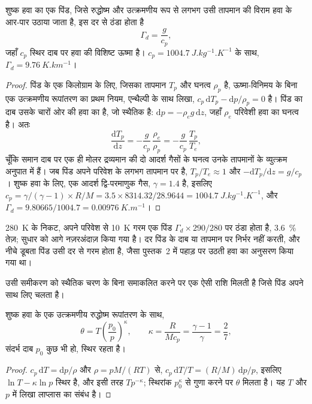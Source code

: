 \begin{theorem}[शुष्क रुद्धोष्म तापह्रास दर]\label{thm:b1:fluid-envelopes-structure:dry-adiabatic}
शुष्क हवा का एक पिंड, जिसे रुद्धोष्म और उत्क्रमणीय रूप से लगभग उसी तापमान की विराम हवा के आर-पार उठाया जाता है, इस दर से ठंडा होता है
\[
  \Gamma_d = \frac{g}{c_p},
\]
जहाँ $c_p$ स्थिर दाब पर हवा की विशिष्ट ऊष्मा है। $c_p =
\qty{1004.7}{J.kg^{-1}.K^{-1}}$ के साथ, $\Gamma_d = \qty{9.76}{K.km^{-1}}$।
\end{theorem}

\begin{proof}
पिंड के एक किलोग्राम के लिए, जिसका तापमान $T_p$ और घनत्व $\rho_p$ है, ऊष्मा-विनिमय के बिना एक उत्क्रमणीय रूपांतरण का प्रथम नियम, एन्थैल्पी के साथ लिखा, $c_p\,\mathrm dT_p - \mathrm dp/\rho_p = 0$ है। पिंड का दाब उसके चारों ओर की हवा का है, जो स्थैतिक है: $\mathrm dp = -\rho_e
g\,\mathrm dz$, जहाँ $\rho_e$ परिवेशी हवा का घनत्व है। अतः
\[
  \frac{\mathrm dT_p}{\mathrm dz} = -\frac{g}{c_p}\,\frac{\rho_e}{\rho_p}
  = -\frac{g}{c_p}\,\frac{T_p}{T_e},
\]
चूँकि समान दाब पर एक ही मोलर द्रव्यमान की दो आदर्श गैसों के घनत्व उनके तापमानों के व्युत्क्रम अनुपात में हैं। जब पिंड अपने परिवेश के लगभग तापमान पर है, $T_p/T_e \approx 1$ और $-\mathrm dT_p/\mathrm dz
= g/c_p$। शुष्क हवा के लिए, एक आदर्श द्वि-परमाणुक गैस, $\gamma = 1.4$ है, इसलिए $c_p =
\gamma/(\gamma - 1) \times R/M = 3.5 \times 8314.32/28.9644 =
\qty{1004.7}{J.kg^{-1}.K^{-1}}$, और $\Gamma_d = 9.80665/1004.7 =
\qty{0.00976}{K.m^{-1}}$।
\end{proof}

\qty{280}{K} के निकट, अपने परिवेश से \qty{10}{K} गरम एक पिंड $\Gamma_d \times 290/280$ पर ठंडा होता है, \qty{3.6}{\percent} तेज़; सुधार को आगे नज़रअंदाज़ किया गया है। दर पिंड के दाब या तापमान पर निर्भर नहीं करती, और नीचे डूबता पिंड उसी दर से गरम होता है, जैसा पुस्तक~2 में पहाड़ पर उठती हवा का अनुसरण किया गया था।

उसी समीकरण को स्थैतिक चरण के बिना समाकलित करने पर एक ऐसी राशि मिलती है जिसे पिंड अपने साथ लिए चलता है।

\begin{proposition}[विभव तापमान]\label{prop:b1:fluid-envelopes-structure:theta}
शुष्क हवा के एक उत्क्रमणीय रुद्धोष्म रूपांतरण के साथ,
\[
  \theta = T\left(\frac{p_0}{p}\right)^{\kappa},\qquad \kappa = \frac{R}{Mc_p} =
  \frac{\gamma - 1}{\gamma} = \frac{2}{7},
\]
संदर्भ दाब $p_0$ कुछ भी हो, स्थिर रहता है।
\end{proposition}

\begin{proof}
$c_p\,\mathrm dT = \mathrm dp/\rho$ और $\rho = pM/(RT)$ से, $c_p\,\mathrm dT/T
= (R/M)\,\mathrm dp/p$, इसलिए $\ln T - \kappa \ln p$ स्थिर है, और इसी तरह $T
p^{-\kappa}$; स्थिरांक $p_0^{\kappa}$ से गुणा करने पर $\theta$ मिलता है। यह $T$ और $p$ में लिखा लाप्लास का संबंध है।
\end{proof}

